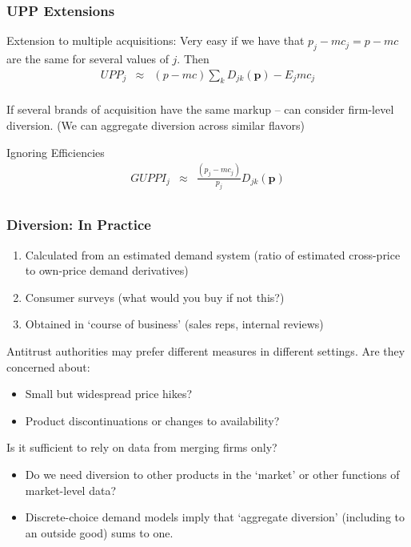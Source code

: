 \documentclass[xcolor=pdftex,dvipsnames,table,mathserif]{beamer}
\begin{document}
\begin{frame}
\frametitle{UPP Extensions}
\begin{block}{Extension to multiple acquisitions:}
Very easy if we have that $p_j - mc_j = p - mc$ are the same for several values of $j$.  Then
\begin{eqnarray*}
UPP_j &\approx& (p - mc) \sum_k D_{jk}(\mathbf{p}) -  E_j mc_j \\
\end{eqnarray*}
\end{block}
If several brands of acquisition have the same markup -- can consider firm-level diversion. (We can aggregate diversion across similar flavors)
\begin{block}{Ignoring Efficiencies}
\begin{eqnarray*}
GUPPI_j &\approx& \frac{(p_j - mc_j)}{p_j} D_{jk}(\mathbf{p}) \\
\end{eqnarray*}
\end{block}

\end{frame}



\begin{frame}
\frametitle{Diversion: In Practice}
\begin{enumerate}
\item Calculated from an estimated demand system (ratio of estimated cross-price to own-price demand derivatives)
\item Consumer surveys (what would you buy if not this?)
\item Obtained in `course of business' (sales reps, internal reviews)
\end{enumerate}
Antitrust authorities may prefer different measures in different settings. Are they concerned about:
\begin{itemize}
\item Small but widespread price hikes?
\item Product discontinuations or changes to availability?
\end{itemize}
Is it sufficient to rely on data from merging firms only?
\begin{itemize}
\item Do we need diversion to other products in the `market' or other functions of market-level data?
\item Discrete-choice demand models imply that `aggregate diversion' (including to an outside good) sums to one.
\end{itemize}
\end{frame}
\end{document}
